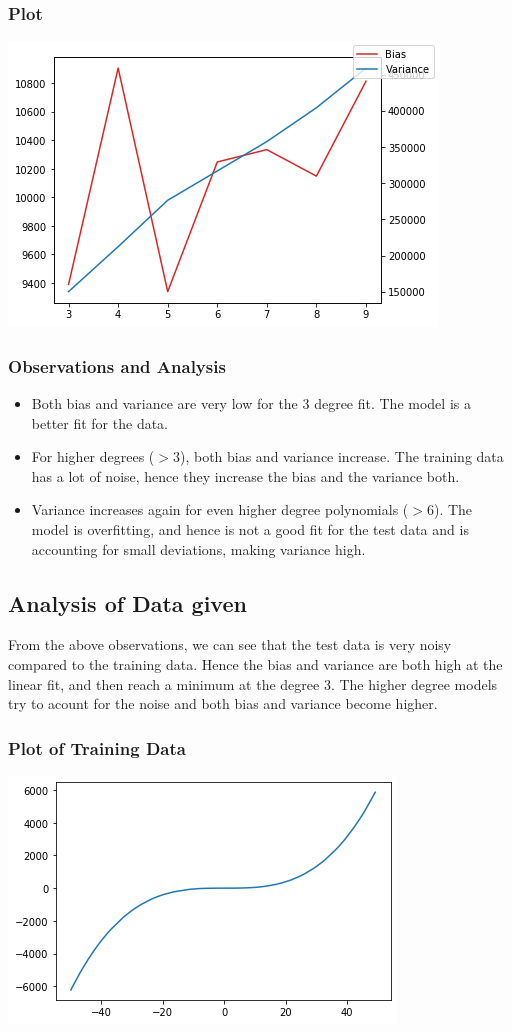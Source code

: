 \documentclass{article}
\begin{document}
\subsubsection{Plot}
\includegraphics[scale=.9]{images/3-9.png}
\subsubsection{Observations and Analysis}
\begin{itemize}
\item Both bias and variance are very low for the 3 degree fit. The model is a better fit for the data.
\item For higher degrees ($>$3), both bias and variance increase. The training data has a lot of noise, hence they increase the bias and the variance both.
\item Variance increases again for even higher degree polynomials ($>$6). The model is overfitting, and hence is not a good fit for the test data and is accounting for small deviations, making variance high.
\end{itemize}
\subsection{Analysis of Data given}
From the above observations, we can see that the test data is very noisy compared to the training data. Hence the bias and variance are both high at the linear fit, and then reach a minimum at the degree 3. The higher degree models try to acount for the noise and both bias and variance become higher.

\subsubsection{Plot of Training Data}
\includegraphics[scale=.9]{images/train-2.png}
\end{document}
